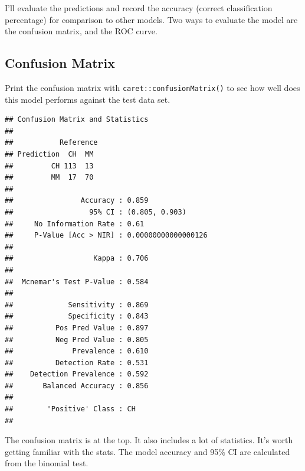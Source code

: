 \documentclass[
]{book}
\newenvironment{Shaded}{\begin{snugshade}}{\end{snugshade}}
\newcommand{\DataTypeTok}[1]{\textcolor[rgb]{0.13,0.29,0.53}{#1}}
\newcommand{\KeywordTok}[1]{\textcolor[rgb]{0.13,0.29,0.53}{\textbf{#1}}}
\newcommand{\NormalTok}[1]{#1}
\newcommand{\OperatorTok}[1]{\textcolor[rgb]{0.81,0.36,0.00}{\textbf{#1}}}
\newcommand{\StringTok}[1]{\textcolor[rgb]{0.31,0.60,0.02}{#1}}
\begin{document}
I'll evaluate the predictions and record the accuracy (correct classification percentage) for comparison to other models. Two ways to evaluate the model are the confusion matrix, and the ROC curve.

\hypertarget{confusion-matrix}{%
\subsection{Confusion Matrix}\label{confusion-matrix}}

Print the confusion matrix with \texttt{caret::confusionMatrix()} to see how well does this model performs against the test data set.

\begin{Shaded}
\end{Shaded}

\begin{verbatim}
## Confusion Matrix and Statistics
## 
##           Reference
## Prediction  CH  MM
##         CH 113  13
##         MM  17  70
##                                              
##                Accuracy : 0.859              
##                  95% CI : (0.805, 0.903)     
##     No Information Rate : 0.61               
##     P-Value [Acc > NIR] : 0.00000000000000126
##                                              
##                   Kappa : 0.706              
##                                              
##  Mcnemar's Test P-Value : 0.584              
##                                              
##             Sensitivity : 0.869              
##             Specificity : 0.843              
##          Pos Pred Value : 0.897              
##          Neg Pred Value : 0.805              
##              Prevalence : 0.610              
##          Detection Rate : 0.531              
##    Detection Prevalence : 0.592              
##       Balanced Accuracy : 0.856              
##                                              
##        'Positive' Class : CH                 
## 
\end{verbatim}

The confusion matrix is at the top. It also includes a lot of statistics. It's worth getting familiar with the stats. The model accuracy and 95\% CI are calculated from the binomial test.
\end{document}
